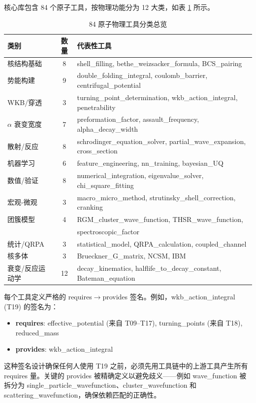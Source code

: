 \documentclass[12pt,a4paper]{article}
\begin{document}
核心库包含 84 个原子工具，按物理功能分为 12 大类，如表 \ref{tab:tool_taxonomy} 所示。

\begin{table}[h]
\centering
\caption{84 原子物理工具分类总览}
\label{tab:tool_taxonomy}
\begin{tabular}{lcl}
\toprule
\textbf{类别} & \textbf{数量} & \textbf{代表性工具} \\
\midrule
核结构基础 & 8 & shell\_filling, bethe\_weizsacker\_formula, BCS\_pairing \\
势能构建 & 9 & double\_folding\_integral, coulomb\_barrier, centrifugal\_potential \\
WKB/穿透 & 3 & turning\_point\_determination, wkb\_action\_integral, penetrability \\
$\alpha$ 衰变宽度 & 7 & preformation\_factor, assault\_frequency, alpha\_decay\_width \\
散射/反应 & 8 & schrodinger\_equation\_solver, partial\_wave\_expansion, cross\_section \\
机器学习 & 6 & feature\_engineering, nn\_training, bayesian\_UQ \\
数值/验证 & 8 & numerical\_integration, eigenvalue\_solver, chi\_square\_fitting \\
宏观-微观 & 3 & macro\_micro\_method, strutinsky\_shell\_correction, cranking \\
团簇模型 & 4 & RGM\_cluster\_wave\_function, THSR\_wave\_function, \\   
{} &  {} & spectroscopic\_factor \\
统计/QRPA & 3 & statistical\_model, QRPA\_calculation, coupled\_channel \\
核多体 & 3 & Brueckner\_G\_matrix, NCSM, IBM \\
衰变/反应运动学 & 12 & decay\_kinematics, halflife\_to\_decay\_constant, Bateman\_equation \\
\bottomrule
\end{tabular}
\end{table}

每个工具定义严格的 requires$\rightarrow$provides 签名。例如，wkb\_action\_integral (T19) 的签名为：
\begin{itemize}
\vspace{1em}
\item \textbf{requires}: effective\_potential (来自 T09--T17), turning\_points (来自 T18), reduced\_mass
\item \textbf{provides}: wkb\_action\_integral
\end{itemize}
\vspace{1em}
这种签名设计确保任何人使用 T19 之前，必须先用工具链中的上游工具产生所有 requires 量。关键的 provides 被精确定义以避免歧义——例如 wave\_function 被拆分为 single\_particle\_wavefunction、cluster\_wavefunction 和 scattering\_wavefunction，确保依赖匹配的正确性。
\end{document}
